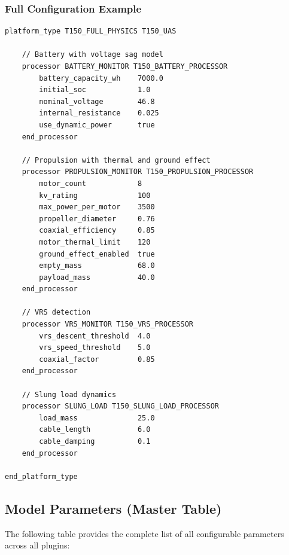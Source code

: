 \subsubsection{\unclass Full Configuration Example}\label{sec:FullConfigExample}

\begin{codebox}
\begin{lstlisting}
platform_type T150_FULL_PHYSICS T150_UAS

    // Battery with voltage sag model
    processor BATTERY_MONITOR T150_BATTERY_PROCESSOR
        battery_capacity_wh    7000.0
        initial_soc            1.0
        nominal_voltage        46.8
        internal_resistance    0.025
        use_dynamic_power      true
    end_processor

    // Propulsion with thermal and ground effect
    processor PROPULSION_MONITOR T150_PROPULSION_PROCESSOR
        motor_count            8
        kv_rating              100
        max_power_per_motor    3500
        propeller_diameter     0.76
        coaxial_efficiency     0.85
        motor_thermal_limit    120
        ground_effect_enabled  true
        empty_mass             68.0
        payload_mass           40.0
    end_processor

    // VRS detection
    processor VRS_MONITOR T150_VRS_PROCESSOR
        vrs_descent_threshold  4.0
        vrs_speed_threshold    5.0
        coaxial_factor         0.85
    end_processor

    // Slung load dynamics
    processor SLUNG_LOAD T150_SLUNG_LOAD_PROCESSOR
        load_mass              25.0
        cable_length           6.0
        cable_damping          0.1
    end_processor

end_platform_type
\end{lstlisting}
\end{codebox}

\subsection{\unclass Model Parameters (Master Table)}\label{sec:MasterParameterTable}

\unclass The following table provides the complete list of all configurable parameters across all plugins:

